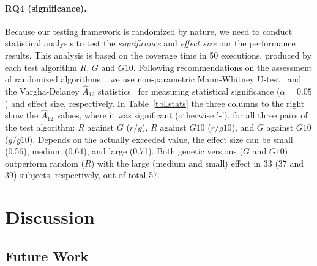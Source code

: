 \documentclass[sigconf,review, anonymous]{acmart}
\begin{document}
\paragraph{\textbf{RQ4 (significance).}} Because our testing framework is randomized by nature, we need to conduct statistical analysis to test the \emph{significance} and \emph{effect size} our the performance results. This analysis is based on the coverage time in 50 executions, produced by each test algorithm $R$, $G$ and $G10$. Following recommendations on the assessment of randomized algorithms~\cite{arcuri2011practical}, we use non-parametric Mann-Whitney U-test~\cite{mann1947test} and the Vargha-Delaney $\hat{A}_{12}$ statistics~\cite{vargha2000critique} for measuring statistical significance ($\alpha=0.05$) and effect size, respectively. In Table~\ref{tbl.stats} the three columns to the right show the $\hat{A}_{12}$ values, where it was significant (otherwise '-'), for all three pairs of the test algorithm: $R$ against $G$ ($r/g$), $R$ against $G10$ ($r/g10$), and $G$ against $G10$ ($g/g10$). Depends on the actually exceeded value, the effect size can be small (0.56), medium (0.64), and large (0.71). Both genetic versions ($G$ and $G10$) outperform random ($R$) with the large (medium and small) effect in 33 (37 and 39) subjects, respectively, out of total 57. 

% 


\section{Discussion}
\label{sec.disc}

\subsection{Future Work}
\label{sub.sec.fut.work}
\end{document}
